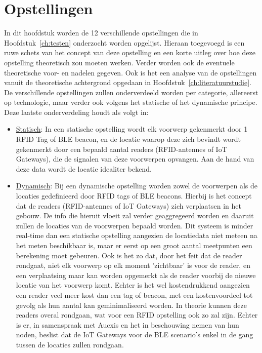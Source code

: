 
\chapter{Opstellingen}
\label{ch:opstellingen}

In dit hoofdstuk worden de 12 verschillende opstellingen die in Hoofdstuk~\ref{ch:testen} onderzocht worden opgelijst. Hieraan toegevoegd is een ruwe schets van het concept van deze opstelling en een korte uitleg over hoe deze opstelling theoretisch zou moeten werken. Verder worden ook de eventuele theoretische voor- en nadelen gegeven. Ook is het een analyse van de opstellingen vanuit de theoretische achtergrond opgedaan in Hoofdstuk~\ref{ch:literatuurstudie}. De verschillende opstellingen zullen onderverdeeld worden per categorie, allereerst op technologie, maar verder ook volgens het statische of het dynamische principe. 
Deze laatste onderverdeling houdt als volgt in:
\begin{itemize}
	\item \underline{Statisch}:
	In een statische opstelling wordt elk voorwerp gekenmerkt door 1 RFID Tag of BLE beacon, en de locatie waarop deze zich bevindt wordt gekenmerkt door een bepaald aantal readers (RFID-antennes of IoT Gateways), die de signalen van deze voorwerpen opvangen. Aan de hand van deze data wordt de locatie idealiter bekend.
	\item \underline{Dynamisch}:
	Bij een dynamische opstelling worden zowel de voorwerpen als de locaties gedefinieerd door RFID tags of BLE beacons. Hierbij is het concept dat de readers (RFID-antennes of IoT Gateways) zich verplaatsen in het gebouw. De info die hieruit vloeit zal verder geaggregeerd worden en daaruit zullen de locaties van de voorwerpen bepaald worden. Dit systeem is minder real-time dan een statische opstelling aangezien de locatiedata niet meteen na het meten beschikbaar is, maar er eerst op een groot aantal meetpunten een berekening moet gebeuren. Ook is het zo dat, door het feit dat de reader rondgaat, niet elk voorwerp op elk moment 'zichtbaar' is voor de reader, en een verplaatsing maar kan worden opgemerkt als de reader voorbij de nieuwe locatie van het voorwerp komt. Echter is het wel kostendrukkend aangezien een reader veel meer kost dan een tag of beacon, met een kostenvoordeel tot gevolg als hun aantal kan geminimaliseerd worden.
	In theorie kunnen deze readers overal rondgaan, wat voor een RFID opstelling ook zo zal zijn. Echter is er, in samenspraak met Aucxis en het in beschouwing nemen van hun noden, beslist dat de IoT Gateways voor de BLE scenario's enkel in de gang tussen de locaties zullen rondgaan.
\end{itemize}

